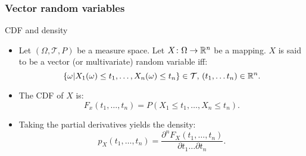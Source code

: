 \begin{frame}
    \frametitle{Vector random variables}
\begin{block}{CDF and density}
    \begin{itemize}
        \item<+-> Let $\left(\Omega , \mathcal{T}, P  \right)$ be a measure space. Let $X \colon \Omega \to \mathbb{R}^n$ be a mapping.
        $X$ is said to be a vector (or multivariate) random variable iff:
        \begin{equation}
            \left\{ \omega \vert X_1(\omega) \leq t_1, \dots, X_n(\omega) \leq t_n \right\} \in \mathcal{T},  \, (t_1,\dots t_n) \in \mathbb{R}^n.
        \end{equation}
        \item<+-> The CDF of $X$ is:
        \begin{equation}
           F_x(t_1,\dots,t_n)=P\left( X_1 \leq t_1, \dots, X_n \leq t_n \right).
        \end{equation}
        \item<+-> Taking the partial derivatives yields the density:
        \begin{equation}
            p_X(t_1,\dots, t_n) = \frac{\partial^n F_X(t_1,\dots,t_n) }{\partial t_1\dots \partial t_n}.
        \end{equation}
    \end{itemize}
\end{block}
\end{frame}


